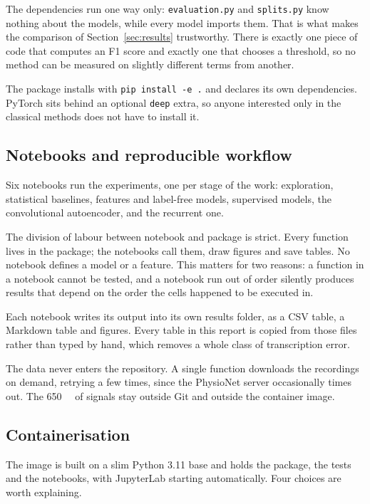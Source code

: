\documentclass[a4paper, 12pt]{article}
\begin{document}
The dependencies run one way only: \texttt{evaluation.py} and \texttt{splits.py}
know nothing about the models, while every model imports them. That is what makes
the comparison of Section~\ref{sec:results} trustworthy. There is exactly one
piece of code that computes an F1 score and exactly one that chooses a threshold,
so no method can be measured on slightly different terms from another.

The package installs with \texttt{pip install -e .} and declares its own
dependencies. PyTorch sits behind an optional \texttt{deep} extra, so anyone
interested only in the classical methods does not have to install it.

\subsection{Notebooks and reproducible workflow} \label{subsec:notebooks}

Six notebooks run the experiments, one per stage of the work: exploration,
statistical baselines, features and label-free models, supervised models, the
convolutional autoencoder, and the recurrent one.

The division of labour between notebook and package is strict. Every function
lives in the package; the notebooks call them, draw figures and save tables. No
notebook defines a model or a feature. This matters for two reasons: a function in
a notebook cannot be tested, and a notebook run out of order silently produces
results that depend on the order the cells happened to be executed in.

Each notebook writes its output into its own results folder, as a CSV table, a
Markdown table and figures. Every table in this report is copied from those files
rather than typed by hand, which removes a whole class of transcription error.

The data never enters the repository. A single function downloads the recordings
on demand, retrying a few times, since the PhysioNet server occasionally times
out. The \SI{650}{\mega\byte} of signals stay outside Git and outside the
container image.

\subsection{Containerisation} \label{subsec:container}

The image is built on a slim Python 3.11 base and holds the package, the tests and
the notebooks, with JupyterLab starting automatically. Four choices are worth
explaining.
\end{document}
